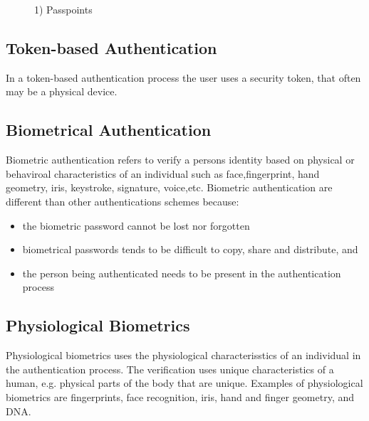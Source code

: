         \begin{figure}[H]
          \centering
          \caption{1) Passpoints}
        \end{figure}

    \subsection{Token-based Authentication}
      In a token-based authentication process the user uses a security token, that often may be a physical device.
      
    \subsection{Biometrical Authentication}
      Biometric authentication refers to verify a persons identity based on physical or behaviroal characteristics of an individual such as face,fingerprint, hand geometry, iris, keystroke, signature, voice,etc\cite{biometrics, biometrics2}. Biometric authentication are different than other authentications schemes because:

        \begin{itemize}
          \item the biometric password cannot be lost nor forgotten
          \item biometrical passwords tends to be difficult to copy, share and distribute, and 
          \item the person being authenticated needs to be present in the authentication process
        \end{itemize} 

      \subsection*{Physiological Biometrics}
        Physiological biometrics uses the physiological characterisstics of an individual in the authentication process. The verification uses unique characteristics of a human, e.g. physical parts of the body that are unique. Examples of physiological biometrics are fingerprints, face recognition, iris, hand and finger geometry, and DNA. 

